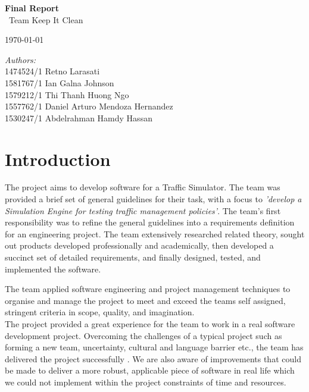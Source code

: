 \documentclass[11pt]{article}
\begin{document}
	\begin{titlepage}
	\center
	\newcommand{\HRule}{\rule{\linewidth}{0.5mm}} 

        {\huge \bfseries Final Report}\\[0.4cm]
        	\ Team Keep It Clean
        
        {\large \today}\\[10cm] 
        
        \begin{minipage}{0.4\textwidth}
        		\emph{Authors:}\\
        			1474524/1	Retno Larasati\\
                    1581767/1	Ian Galna Johnson\\	
                    1579212/1	Thi Thanh Huong Ngo\\
                    1557762/1	Daniel Arturo Mendoza Hernandez\\
                    1530247/1	Abdelrahman Hamdy Hassan\\
        \end{minipage}

\end{titlepage}
\tableofcontents
\newpage
	
\section{Introduction}
The project aims to develop software for a Traffic Simulator. The team was provided a brief set of general guidelines for their task, with a focus to \textit{'develop a Simulation Engine for testing traffic management policies'}. The team's first responsibility was to refine the general guidelines into a requirements definition for an engineering project. The team extensively researched related theory, sought out products developed professionally and academically, then developed a succinct set of detailed requirements, and finally designed, tested, and implemented the software. 

The team applied software engineering and project management techniques to organise and manage the project to meet and exceed the teams self assigned, stringent criteria in scope, quality, and imagination.\\

The project provided a great experience for the team to work in a real software development project. Overcoming the challenges of a typical project such as forming a new team, uncertainty, cultural and language barrier etc., the team has delivered the project successfully . We are also aware  of improvements that could be made to deliver a more robust, applicable piece of software in real life which we could not implement within the project constraints of time and resources.\\
\end{document}
